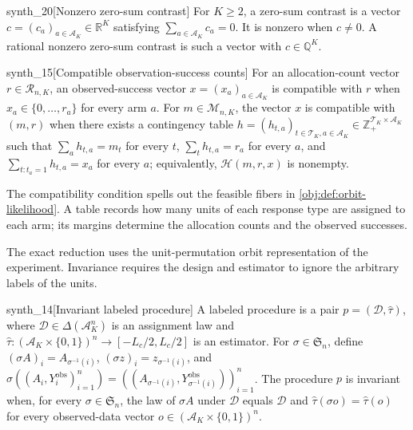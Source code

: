 \begin{definitionv}{synth_20}[Nonzero zero-sum contrast]
For \(K\ge 2\), a zero-sum contrast is a vector \(c=(c_a)_{a\in\mathcal A_K}\in\mathbb R^K\) satisfying \(\sum_{a\in\mathcal A_K}c_a=0\). It is nonzero when \(c\neq 0\). A rational nonzero zero-sum contrast is such a vector with \(c\in\mathbb Q^K\).
\end{definitionv}

\begin{definitionv}{synth_15}[Compatible observation-success counts]
For an allocation-count vector \(r\in\mathcal R_{n,K}\), an observed-success vector \(x=(x_a)_{a\in\mathcal A_K}\) is compatible with \(r\) when \(x_a\in\{0,\ldots,r_a\}\) for every arm \(a\). For \(m\in\mathcal M_{n,K}\), the vector \(x\) is compatible with \((m,r)\) when there exists a contingency table \(h=(h_{t,a})_{t\in\mathcal T_K,a\in\mathcal A_K}\in\mathbb Z_+^{\mathcal T_K\times\mathcal A_K}\) such that \(\sum_a h_{t,a}=m_t\) for every \(t\), \(\sum_t h_{t,a}=r_a\) for every \(a\), and \(\sum_{t:t_a=1}h_{t,a}=x_a\) for every \(a\); equivalently, \(\mathcal H(m,r,x)\) is nonempty.
\end{definitionv}

The compatibility condition spells out the feasible fibers in \cref{obj:def:orbit-likelihood}. A table  records how many units of each response type are assigned to each arm; its margins determine the allocation counts and the observed successes.

The exact reduction uses the unit-permutation orbit representation of the experiment. Invariance requires the design and estimator to ignore the arbitrary labels of the units.

\begin{definitionv}{synth_14}[Invariant labeled procedure]
A labeled procedure is a pair \(p=(\mathcal D,\widehat\tau)\), where \(\mathcal D\in\Delta(\mathcal A_K^n)\) is an assignment law and \(\widehat\tau:(\mathcal A_K\times\{0,1\})^n\to[-L_c/2,L_c/2]\) is an estimator. For \(\sigma\in\mathfrak S_n\), define \((\sigma A)_i=A_{\sigma^{-1}(i)}\), \((\sigma z)_i=z_{\sigma^{-1}(i)}\), and \(\sigma((A_i,Y_i^{\mathrm{obs}})_{i=1}^n)=((A_{\sigma^{-1}(i)},Y_{\sigma^{-1}(i)}^{\mathrm{obs}}))_{i=1}^n\). The procedure \(p\) is invariant when, for every \(\sigma\in\mathfrak S_n\), the law of \(\sigma A\) under \(\mathcal D\) equals \(\mathcal D\) and \(\widehat\tau(\sigma o)=\widehat\tau(o)\) for every observed-data vector \(o\in(\mathcal A_K\times\{0,1\})^n\).
\end{definitionv}

